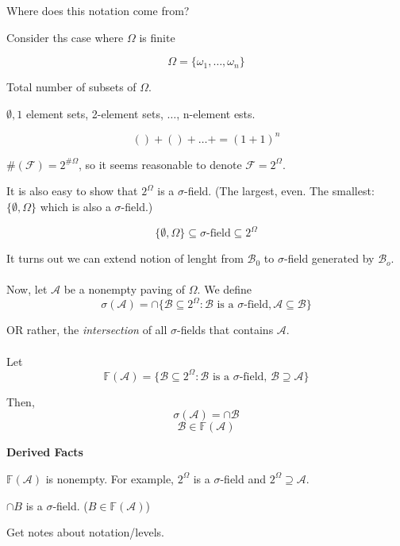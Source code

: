 \documentclass[11pt,fleqn]{book} %
\begin{document}
\begin{remark}
	Where does this notation come from?

Consider ths case where $\Omega$ is finite

$$\Omega = \{\omega_1, \dots, \omega_n \} $$

Total number of subsets of $\Omega$. 

$\emptyset, 1$ element sets, 2-element sets, $\dots$, n-element ests.

$$() + () + \dots + = (1+1)^n$$

$\#(\mathscr{F})  = 2^{\# \Omega}$, so it seems reasonable to denote $\mathscr{F} = 2^\Omega$. 

It is also easy to show that $2^\Omega$ is a $\sigma$-field. (The largest, even. The smallest: $\{\emptyset, \Omega\}$ which is also a $\sigma$-field.)

$$\{\emptyset, \Omega\} \subseteq \sigma\text{-field} \subseteq 2^\Omega$$ 
\end{remark}

It turns out we can extend notion of lenght from $\mathscr{B}_0$ to $\sigma$-field generated by $\mathscr{B}_o$. \\
\\
Now, let $\mathscr{A}$ be a nonempty paving of $\Omega$. We define 
$$\sigma(\mathscr{A}) = \cap \{\mathscr{B} \subseteq 2^\Omega: \mathscr{B}\text{ is a }\sigma\text{-field}, \mathscr{A} \subseteq \mathscr{B}\} $$

OR rather, the \textit{intersection} of all $\sigma$-fields that contains $\mathscr{A}$. \\
\\
Let 
$$\mathbb{F}(\mathscr{A}) = \{\mathscr{B} \subseteq 2^\Omega: \mathscr{B} \text{ is a } \sigma\text{-field, } \mathscr{B} \supseteq \mathscr{A} \}$$

Then, 
$$\sigma(\mathscr{A}) = \cap \mathscr{B}$$
$$\mathscr{B} \in \mathbb{F}(\mathscr{A}) $$

\textbf{Derived Facts}

$\mathbb{F}(\mathscr{A})$ is nonempty. For example, $2^\Omega$ is a $\sigma$-field and $2^\Omega \supseteq \mathscr{A}$. 

$\cap B$ is a $\sigma$-field. ($B \in \mathbb{F}(\mathscr{A})$)

\begin{remark}
	Get notes about notation/levels.
\end{remark}
\end{document}
